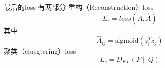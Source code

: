 \documentclass[color=gray,base=hide,cn]{elegantbook}
\begin{document}
最后的loss 有两部分
重构（Reconstruction）loss
\begin{equation}
    L_r = loss(A, \hat{A})
\end{equation}
其中
\begin{equation}
    \hat{A}_{ij} = \text{sigmoid} (z_i ^T z
_j)
\end{equation}
聚类（clusgtering）loss
\begin{equation}
    L_c = D_{KL}(P\|Q)
\end{equation}

% 

\end{document}

